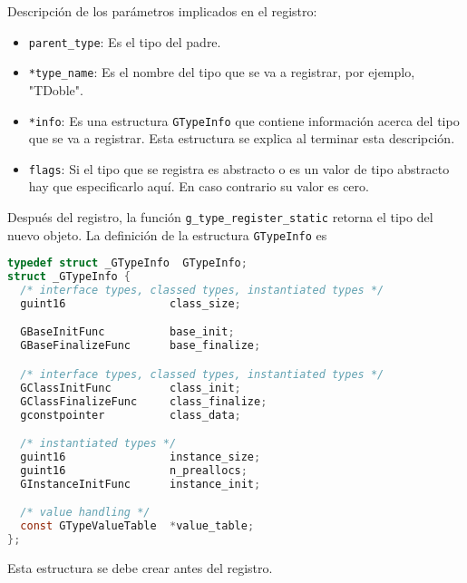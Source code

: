\newpage
Descripción de los parámetros implicados en el registro:
\begin{itemize}
  \tightlist
\item \texttt{parent\_type}: Es el tipo del padre.
\item \texttt{*type\_name}: Es el nombre del tipo que se va a registrar,
  por ejemplo, "\textsf{TDoble}".
\item \texttt{*info}: Es una estructura \texttt{GTypeInfo} que contiene información acerca
  del tipo que se va a registrar. Esta estructura se explica al terminar esta descripción.
\item \texttt{flags}: Si el tipo que se registra es abstracto o es un valor de tipo
  abstracto\footnotemark{} hay que especificarlo aquí. En caso contrario su valor es cero.
\end{itemize}
Después del registro, la función \texttt{g\_type\_register\_static} retorna
el tipo del nuevo objeto. La definición de la estructura \texttt{GTypeInfo} es
\begin{lstlisting}[language=C]
typedef struct _GTypeInfo  GTypeInfo;
struct _GTypeInfo {
  /* interface types, classed types, instantiated types */
  guint16                class_size;

  GBaseInitFunc          base_init;
  GBaseFinalizeFunc      base_finalize;

  /* interface types, classed types, instantiated types */
  GClassInitFunc         class_init;
  GClassFinalizeFunc     class_finalize;
  gconstpointer          class_data;

  /* instantiated types */
  guint16                instance_size;
  guint16                n_preallocs;
  GInstanceInitFunc      instance_init;

  /* value handling */
  const GTypeValueTable  *value_table;
};
\end{lstlisting}

Esta estructura se debe crear antes del registro.

